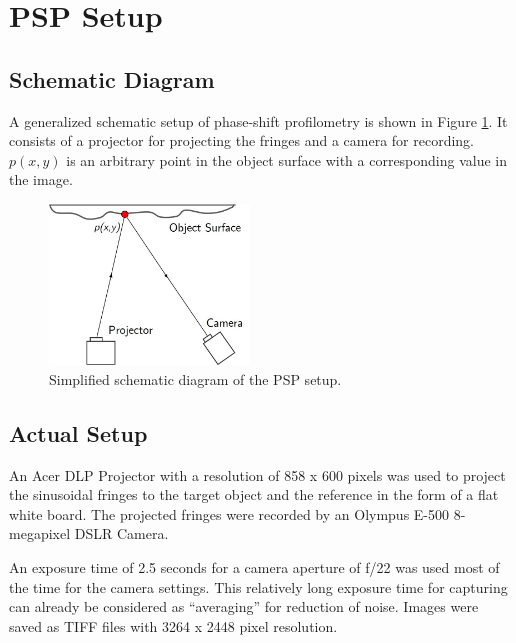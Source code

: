 \section{PSP Setup}

\subsection{Schematic Diagram}
A generalized schematic setup of phase-shift profilometry is shown in Figure \ref{fig:setup}. It consists of a projector for projecting the fringes and a camera for recording. $p(x,y)$ is an arbitrary point in the object surface with a corresponding value in the image.

\captionsetup[figure]{width=5in}
\begin{figure}[h!]
	\centering
	\includegraphics[width=0.475\textwidth]{figures/schematic2.jpg}
	\caption[Simplified schematic diagram of the PSP setup]{Simplified schematic diagram of the PSP setup.}
	\label{fig:setup}
\end{figure}


\subsection{Actual Setup}

An Acer DLP Projector with a resolution of 858 x 600 pixels was used to project the sinusoidal fringes to the target object and the reference in the form of a flat white board. The projected fringes were recorded by an Olympus E-500 8-megapixel DSLR Camera. 

An exposure time of 2.5 seconds for a camera aperture of f/22 was used most of the time for the camera settings. This relatively long exposure time for capturing can already be considered as ``averaging'' for reduction of noise. Images were saved as TIFF files with 3264 x 2448 pixel resolution. 

